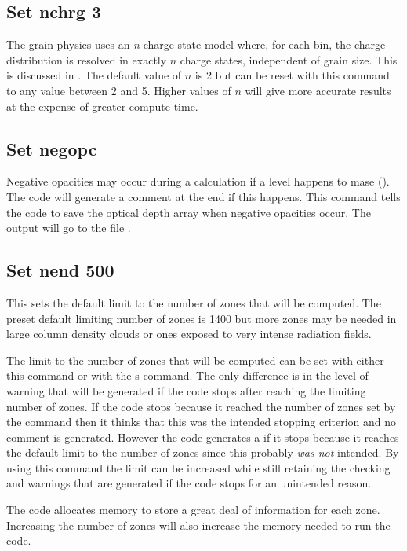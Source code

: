 \subsection{Set nchrg 3}

The grain physics uses an \emph{n}-charge state model where, for each bin,
the charge distribution is resolved in exactly $n$ charge states,
independent of grain size.
This is discussed in \citet{VanHoof2004}.
The default
value of $n$ is 2 but can be reset with this command
to any value between 2 and 5.
Higher values of $n$ will give more accurate results at the expense
of greater compute time.

\subsection{Set negopc}

Negative opacities may occur during a calculation if a level happens
to mase (\citealp{Ferland1993}).
The code will generate a comment at the end if
this happens.
This command tells the code to save the optical depth array
when negative opacities occur.
The output will go to the file
.

\subsection{Set nend 500}

This sets the default limit to the number of zones that will be computed.
The preset default limiting number of zones is 1400 but more zones may be
needed in large column density clouds or ones exposed to very intense
radiation fields.

The limit to the number of zones that will be computed can be set with
either this command or with the s command.
The only difference
is in the level of warning that will be generated if the code stops after
reaching the limiting number of zones.
If the code stops because it reached
the number of zones set by the  command
then it thinks that this
was the intended stopping criterion and no comment is generated.
However
the code generates a  if it stops because
it reaches the default
limit to the number of zones since this probably \emph{was not} intended.  By using
this command the limit can be increased while still retaining the checking
and warnings that are generated if the code stops for an unintended reason.

The code allocates memory to store a great deal of information for each
zone.
Increasing the number of zones will also increase the memory needed
to run the code.

